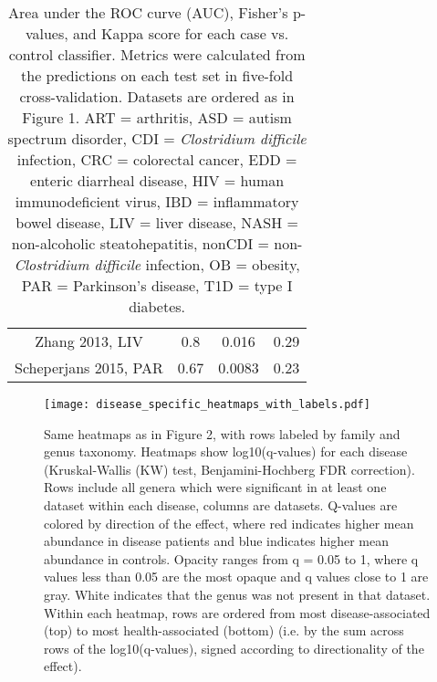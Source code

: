 \documentclass{article}
\begin{document}
{{\begin{table}[h]
{\begin{tabular}{ c  c  c  c}
	Zhang 2013, LIV & 0.8 & 0.016 & 0.29 \\ 
	Scheperjans 2015, PAR & 0.67 & 0.0083 & 0.23 \\ 
	\hline
\end{tabular}}
\caption{Area under the ROC curve (AUC), Fisher's p-values, and Kappa score for each case vs. control classifier. Metrics were calculated from the predictions on each test set in five-fold cross-validation. Datasets are ordered as in Figure 1. ART = arthritis, ASD = autism spectrum disorder, CDI = \textit{Clostridium difficile} infection, CRC = colorectal cancer, EDD = enteric diarrheal disease, HIV = human immunodeficient virus, IBD = inflammatory bowel disease, LIV = liver disease, NASH = non-alcoholic steatohepatitis, nonCDI = non-\textit{Clostridium difficile} infection, OB = obesity, PAR = Parkinson's disease, T1D = type I diabetes.}\label{tab:kappa}
\end{table}
}

\FloatBarrier
{}
\newpage \pdfpagewidth=16in \pdfpageheight=18in 
\FloatBarrier

\begin{figure}[h]
	\begin{centering}
	\texttt{[image: disease\_specific\_heatmaps\_with\_labels.pdf]}
	\caption{Same heatmaps as in Figure 2, with rows labeled by family and genus taxonomy. Heatmaps show log10(q-values) for each disease (Kruskal-Wallis (KW) test, Benjamini-Hochberg FDR correction). Rows include all genera which were significant in at least one dataset within each disease, columns are datasets. Q-values are colored by direction of the effect, where red indicates higher mean abundance in disease patients and blue indicates higher mean abundance in controls. Opacity ranges from q = 0.05 to 1, where q values less than 0.05 are the most opaque and q values close to 1 are gray. White indicates that the genus was not present in that dataset. Within each heatmap, rows are ordered from most disease-associated (top) to most health-associated (bottom) (i.e. by the sum across rows of the log10(q-values), signed according to directionality of the effect).
}
	\label{fig:supp_dis_specific}
	\end{centering}
\end{figure}


\restoregeometry
\FloatBarrier

\newpage \pdfpagewidth=8.5in \pdfpageheight=27in
\FloatBarrier

}
\end{document}

